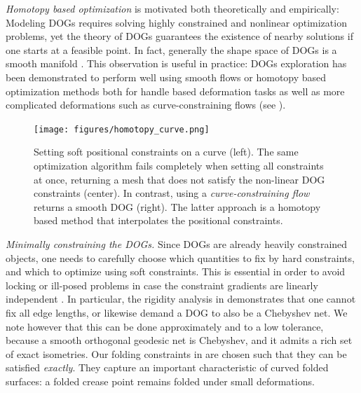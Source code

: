 \emph{Homotopy based optimization} is motivated both theoretically and empirically: Modeling DOGs requires solving highly constrained and nonlinear optimization problems, yet the theory of DOGs guarantees the existence of nearby solutions if one starts at a feasible point. In fact, generally the shape space of DOGs is a smooth manifold \cite{rabi2018shape}. This observation is useful in practice: DOGs exploration has been demonstrated to perform well using smooth flows or homotopy based optimization methods both for handle based deformation tasks as well as  more complicated deformations such as curve-constraining flows \cite{rabi2018shape} (see ).

\begin{figure} [t]
	\centering
	\texttt{[image: figures/homotopy\_curve.png]}
	\caption{Setting soft positional constraints on a curve (left). The same optimization algorithm fails completely when setting all constraints at once, returning a mesh that does not satisfy the non-linear DOG constraints (center). In contrast, using a \emph{curve-constraining flow} \cite{rabi2018shape} returns a smooth DOG (right). The latter approach is a homotopy based method that interpolates the positional constraints.} 
	\label{fig:homotopy_curve}
\end{figure}

\emph{Minimally constraining the DOGs.} Since DOGs are already heavily constrained objects, one needs to carefully choose which quantities to fix by hard constraints, and which to optimize using soft constraints. This is essential in order to avoid locking or ill-posed problems in case the constraint gradients are linearly independent \cite{rabi2018shape}. In particular, the rigidity analysis in \cite{rabi18} demonstrates that one cannot fix all edge lengths, or likewise demand a DOG to also be a Chebyshev net. We note however that this can be done approximately and to a low tolerance, because a smooth orthogonal geodesic net is Chebyshev, and it admits a rich set of exact isometries. Our folding constraints in  are chosen such that they can be satisfied \emph{exactly}. They capture an important characteristic of curved folded surfaces: a folded crease point remains folded under small deformations.
